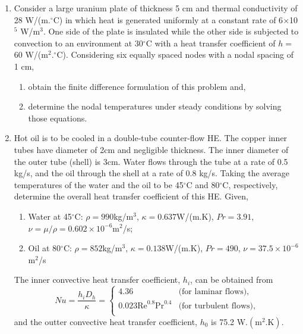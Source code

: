 \documentclass[12pts,a4paper,amsmath,amssymb,floatfix]{article}%
\newcommand{\dimensionless}[1]{\mathrm{#1}}
\renewcommand{\Re}{\dimensionless{Re}}
\renewcommand{\Pr}{\dimensionless{Pr}}
\newcommand{\frc}{\displaystyle\frac}
\begin{document}
\begin{enumerate}[label=\bfseries Problem \arabic*:]
\item\label{Problem:FDM_Plate} Consider a large uranium plate of thickness 5 cm and thermal conductivity of 28 W/(m.$^{\circ}$C) in which heat is generated uniformly at a constant rate of 6$\times$10$^{5}$ W/m$^{3}$. One side of the plate is insulated while the other side is subjected to convection to an environment at 30$^{\circ}$C with a heat transfer coefficient of $h=$ 60 W/(m$^{2}.^{\circ}$C). Considering six equally spaced nodes with a nodal spacing of 1 cm,
\begin{enumerate}
  \item obtain the finite difference formulation of this problem and,
  \item determine the nodal temperatures under steady conditions by solving those equations.
\end{enumerate}



\item\label{Problem:HE_Example1} Hot oil is to be cooled in a double-tube counter-flow HE. The copper inner tubes have diameter of 2cm and negligible thickness. The inner diameter of the outer tube (shell) is 3cm. Water flows through the tube at a rate of 0.5 kg/s, and the oil through the shell at a rate of 0.8 kg/s. Taking the average temperatures of the water and the oil to be 45$^{\circ}$C and 80$^{\circ}$C, respectively, determine the overall heat transfer coefficient of this HE. Given, 
\begin{enumerate} 
    \item Water at 45$^{\circ}$C: $\rho=990$kg/m$^{3}$, $\kappa=0.637$W/(m.K), $Pr=3.91$, $\nu=\mu/\rho=0.602\times 10^{-6}$m$^{2}$/s; 
    \item Oil at 80$^{\circ}$C: $\rho=852$kg/m$^{3}$, $\kappa=0.138$W/(m.K), $Pr=490$, $\nu=37.5\times 10^{-6}$m$^{2}$/s
\end{enumerate}
The inner convective heat transfer coefficient, $h_{i}$, can be obtained from
\begin{displaymath}
       Nu = \frc{h_{i}D_{h}}{\kappa} =
   \begin{cases}
       4.36  & \text{(for laminar flows),} \\
       0.023\Re^{0.8}\Pr^{0.4} & \text{(for turbulent flows),} \\
   \end{cases}
\end{displaymath}
and the outter convective heat transfer coefficient, $h_{0}$ is 75.2 W.$\left(\text{m}^{2}.\text{K}\right)$.


\end{enumerate}
\end{document}
